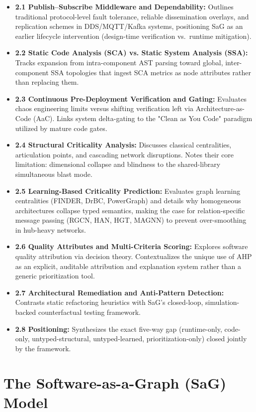 \documentclass[review]{elsarticle}
\begin{document}
\begin{itemize}[leftmargin=*]
  \item \textbf{2.1 Publish--Subscribe Middleware and Dependability:} Outlines traditional protocol-level fault tolerance, reliable dissemination overlays, and replication schemes in DDS/MQTT/Kafka systems, positioning SaG as an earlier lifecycle intervention (design-time verification vs.\ runtime mitigation).
  \item \textbf{2.2 Static Code Analysis (SCA) vs. Static System Analysis (SSA):} Tracks expansion from intra-component AST parsing toward global, inter-component SSA topologies that ingest SCA metrics as node attributes rather than replacing them.
  \item \textbf{2.3 Continuous Pre-Deployment Verification and Gating:} Evaluates chaos engineering limits versus shifting verification left via Architecture-as-Code (AaC). Links system delta-gating to the "Clean as You Code" paradigm utilized by mature code gates.
  \item \textbf{2.4 Structural Criticality Analysis:} Discusses classical centralities, articulation points, and cascading network disruptions. Notes their core limitation: dimensional collapse and blindness to the shared-library simultaneous blast mode.
  \item \textbf{2.5 Learning-Based Criticality Prediction:} Evaluates graph learning centralities (FINDER, DrBC, PowerGraph) and details why homogeneous architectures collapse typed semantics, making the case for relation-specific message passing (RGCN, HAN, HGT, MAGNN) to prevent over-smoothing in hub-heavy networks.
  \item \textbf{2.6 Quality Attributes and Multi-Criteria Scoring:} Explores software quality attribution via decision theory. Contextualizes the unique use of AHP as an explicit, auditable attribution and explanation system rather than a generic prioritization tool.
  \item \textbf{2.7 Architectural Remediation and Anti-Pattern Detection:} Contrasts static refactoring heuristics with SaG's closed-loop, simulation-backed counterfactual testing framework.
  \item \textbf{2.8 Positioning:} Synthesizes the exact five-way gap (runtime-only, code-only, untyped-structural, untyped-learned, prioritization-only) closed jointly by the framework.
\end{itemize}

\section{The Software-as-a-Graph (SaG) Model}
\end{document}
